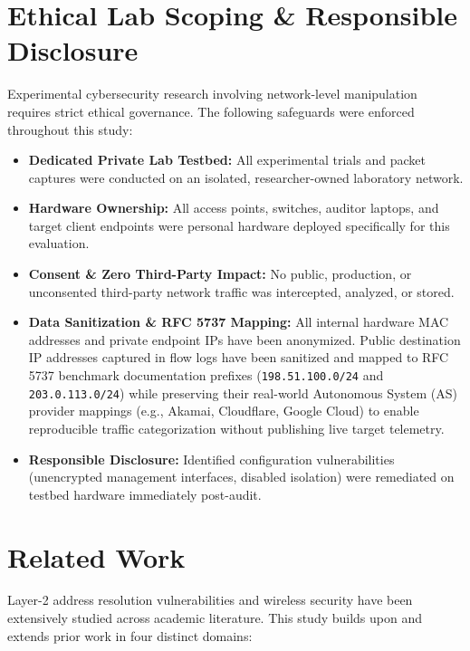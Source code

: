 \documentclass[conference]{IEEEtran}
\begin{document}
\section{Ethical Lab Scoping \& Responsible Disclosure}
Experimental cybersecurity research involving network-level manipulation requires strict ethical governance. The following safeguards were enforced throughout this study:
\begin{itemize}
    \item \textbf{Dedicated Private Lab Testbed:} All experimental trials and packet captures were conducted on an isolated, researcher-owned laboratory network.
    \item \textbf{Hardware Ownership:} All access points, switches, auditor laptops, and target client endpoints were personal hardware deployed specifically for this evaluation.
    \item \textbf{Consent \& Zero Third-Party Impact:} No public, production, or unconsented third-party network traffic was intercepted, analyzed, or stored.
    \item \textbf{Data Sanitization \& RFC 5737 Mapping:} All internal hardware MAC addresses and private endpoint IPs have been anonymized. Public destination IP addresses captured in flow logs have been sanitized and mapped to RFC 5737 benchmark documentation prefixes (\texttt{198.51.100.0/24} and \texttt{203.0.113.0/24}) while preserving their real-world Autonomous System (AS) provider mappings (e.g., Akamai, Cloudflare, Google Cloud) to enable reproducible traffic categorization without publishing live target telemetry.
    \item \textbf{Responsible Disclosure:} Identified configuration vulnerabilities (unencrypted management interfaces, disabled isolation) were remediated on testbed hardware immediately post-audit.
\end{itemize}

\section{Related Work}
Layer-2 address resolution vulnerabilities and wireless security have been extensively studied across academic literature. This study builds upon and extends prior work in four distinct domains:
\end{document}
